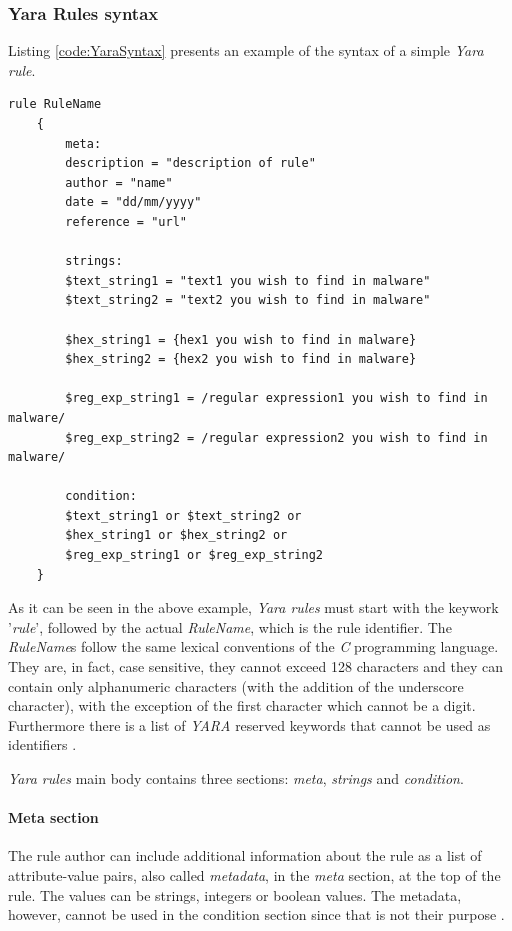 \documentclass[pdfa%
,cucitura%
]{toptesi}
\begin{document}
\subsubsection{Yara Rules syntax}
Listing \ref{code:YaraSyntax} presents an example of the syntax of a simple \textit{Yara rule}.

\begin{lstlisting}[caption={YARA Rules Syntax}, label=code:YaraSyntax, language=YARA, style=mystyle]
	rule RuleName
	{
		meta:
		description = "description of rule"
		author = "name"
		date = "dd/mm/yyyy"
		reference = "url"
		
		strings:
		$text_string1 = "text1 you wish to find in malware"
		$text_string2 = "text2 you wish to find in malware"
		
		$hex_string1 = {hex1 you wish to find in malware}
		$hex_string2 = {hex2 you wish to find in malware}
		
		$reg_exp_string1 = /regular expression1 you wish to find in malware/
		$reg_exp_string2 = /regular expression2 you wish to find in malware/
		
		condition:
		$text_string1 or $text_string2 or
		$hex_string1 or $hex_string2 or
		$reg_exp_string1 or $reg_exp_string2
	}
\end{lstlisting}

As it can be seen in the above example, \textit{Yara rules} must start with the keywork '\textit{rule}', followed by the actual \textit{RuleName}, which is the rule identifier. The \textit{RuleName}s follow the same lexical conventions of the \textit{C} programming language. They are, in fact, case sensitive, they cannot exceed 128 characters and they can contain only alphanumeric characters (with the addition of the underscore character), with the exception of the first character which cannot be a digit. Furthermore there is a list of \textit{YARA} reserved keywords that cannot be used as identifiers \cite{NinjaYSEWDM}.

\textit{Yara rules} main body contains three sections: \textit{meta}, \textit{strings} and \textit{condition}.

\paragraph{Meta section}
The rule author can include additional information about the rule as a list of attribute-value pairs, also called \textit{metadata}, in the \textit{meta} section, at the top of the rule. The values can be strings, integers or boolean values. The metadata, however, cannot be used in the condition section since that is not their purpose \cite{ArntzEYR}.
\end{document}
